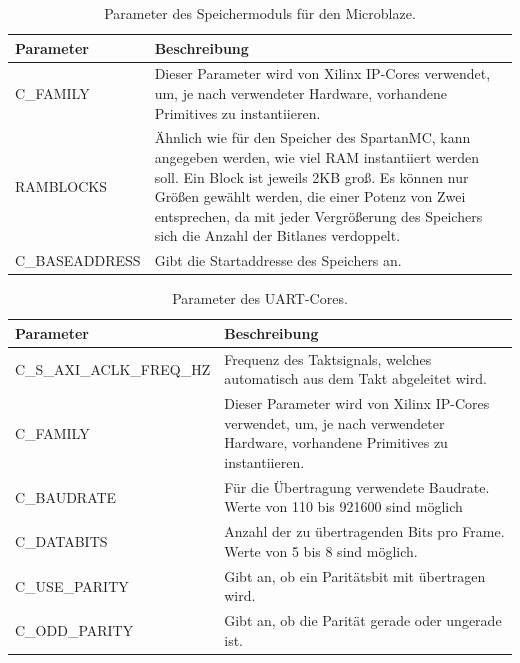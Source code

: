 \begin{table}[ht!]
	\begin{tabular}{|l|p{10cm}|}
		\hline \textbf{Parameter} & \textbf{Beschreibung} \\ 
		\hline C\_FAMILY & Dieser Parameter wird von Xilinx IP-Cores verwendet, um, je nach verwendeter Hardware, vorhandene Primitives zu instantiieren. \\ 
		\hline RAMBLOCKS & Ähnlich wie für den Speicher des SpartanMC, kann angegeben werden, wie viel RAM instantiiert werden soll. Ein Block ist jeweils 2KB groß. Es können nur Größen gewählt werden, die einer Potenz von Zwei entsprechen, da mit jeder Vergrößerung des Speichers sich die Anzahl der Bitlanes verdoppelt.\\ 
		\hline C\_BASEADDRESS & Gibt die Startaddresse des Speichers an.\\ 
		\hline 
	\end{tabular}
	\centering
	\caption{Parameter des Speichermoduls für den Microblaze.}
	\label{tab:MemParam}
\end{table}

\begin{table}[ht!]
	\begin{tabular}{|l|p{10cm}|}
		\hline \textbf{Parameter} & \textbf{Beschreibung} \\ 
		\hline C\_S\_AXI\_ACLK\_FREQ\_HZ & Frequenz des Taktsignals, welches automatisch aus dem Takt abgeleitet wird.\\ 
		\hline C\_FAMILY & Dieser Parameter wird von Xilinx IP-Cores verwendet, um, je nach verwendeter Hardware, vorhandene Primitives zu instantiieren.\\ 
		\hline C\_BAUDRATE & Für die Übertragung verwendete Baudrate. Werte von 110 bis 921600 sind möglich \\ 
		\hline C\_DATABITS & Anzahl der zu übertragenden Bits pro Frame. Werte von 5 bis 8 sind möglich. \\ 
		\hline C\_USE\_PARITY & Gibt an, ob ein Paritätsbit mit übertragen wird. \\ 
		\hline C\_ODD\_PARITY & Gibt an, ob die Parität gerade oder ungerade ist. \\ 
		\hline 
	\end{tabular}
	\centering
	\caption{Parameter des UART-Cores.}
	\label{tab:UARTParam}
\end{table}

